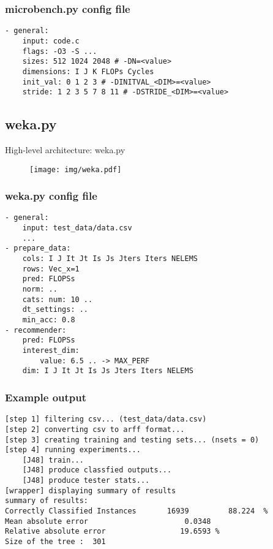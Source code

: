 \documentclass[xcolor=table,hideothersubsections,aspectratio=1610]{beamer}
\begin{document}
\begin{frame}[fragile]
    \frametitle{microbench.py config file}
    \begin{verbatim}
- general:
    input: code.c
    flags: -O3 -S ...
    sizes: 512 1024 2048 # -DN=<value>
    dimensions: I J K FLOPs Cycles
    init_val: 0 1 2 3 # -DINITVAL_<DIM>=<value>
    stride: 1 2 3 5 7 8 11 # -DSTRIDE_<DIM>=<value>
\end{verbatim}
\end{frame}


\subsection{weka.py}
\begin{frame}{High-level architecture: weka.py}
    \begin{figure}
        \centering
        \texttt{[image: img/weka.pdf]}
    \end{figure}
\end{frame}

\begin{frame}[fragile]
    \frametitle{weka.py config file}
    \begin{verbatim}
- general:
    input: test_data/data.csv
    ...
- prepare_data:
    cols: I J It Jt Is Js Jters Iters NELEMS
    rows: Vec_x=1
    pred: FLOPSs
    norm: ..
    cats: num: 10 ..
    dt_settings: ..
    min_acc: 0.8
- recommender:
    pred: FLOPSs
    interest_dim:
        value: 6.5 .. -> MAX_PERF
    dim: I J It Jt Is Js Jters Iters NELEMS
\end{verbatim}
\end{frame}

\begin{frame}[fragile]
    \frametitle{Example output}
    \begin{verbatim}
[step 1] filtering csv... (test_data/data.csv)
[step 2] converting csv to arff format...
[step 3] creating training and testing sets... (nsets = 0)
[step 4] running experiments...
    [J48] train... 
    [J48] produce classfied outputs... 
    [J48] produce tester stats... 
[wrapper] displaying summary of results
summary of results: 
Correctly Classified Instances       16939         88.224  %
Mean absolute error                      0.0348
Relative absolute error                 19.6593 %
Size of the tree : 	301

\end{verbatim}
\end{frame}
\end{document}

